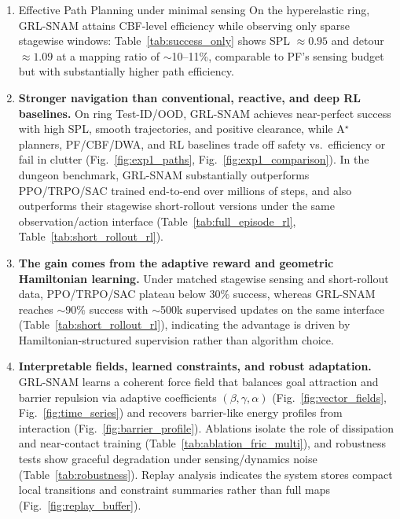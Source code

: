 \documentclass{article} %
\begin{document}
\begin{enumerate}
    \item { Effective Path Planning under minimal sensing}
    On the hyperelastic ring, GRL-SNAM attains CBF-level efficiency while observing only sparse stagewise windows: Table~\ref{tab:success_only} shows SPL $\approx 0.95$ and detour $\approx 1.09$ at a mapping ratio of $\sim$10--11\%, comparable to PF's sensing budget but with substantially higher path efficiency.

    \item \textbf{Stronger navigation than {conventional, reactive, and deep RL baselines.}}
    On ring Test-ID/OOD, GRL-SNAM achieves near-perfect success with high SPL, smooth trajectories, and positive clearance, while A$^{\star}$ planners, PF/CBF/DWA, and RL baselines trade off safety vs.\ efficiency or fail in clutter (Fig.~\ref{fig:exp1_paths}, Fig.~\ref{fig:exp1_comparison}). In the dungeon benchmark, GRL-SNAM substantially outperforms PPO/TRPO/SAC trained end-to-end over millions of steps, and also outperforms their stagewise short-rollout versions under the same observation/action interface (Table~\ref{tab:full_episode_rl}, Table~\ref{tab:short_rollout_rl}).

    \item \textbf{The gain comes from the { adaptive reward and geometric Hamiltonian learning.}}
    Under matched stagewise sensing and short-rollout data, PPO/TRPO/SAC plateau below $30\%$ success, whereas GRL-SNAM reaches $\sim$90\% success with $\sim$500k supervised updates on the same interface (Table~\ref{tab:short_rollout_rl}), indicating the advantage is driven by Hamiltonian-structured supervision rather than algorithm choice.

    \item \textbf{Interpretable fields, learned constraints, and robust adaptation.}
    GRL-SNAM learns a coherent force field that balances goal attraction and barrier repulsion via adaptive coefficients $(\beta,\gamma,\alpha)$ (Fig.~\ref{fig:vector_fields}, Fig.~\ref{fig:time_series}) and recovers barrier-like energy profiles from interaction (Fig.~\ref{fig:barrier_profile}). Ablations isolate the role of dissipation and near-contact training (Table~\ref{tab:ablation_fric_multi}), and robustness tests show graceful degradation under sensing/dynamics noise (Table~\ref{tab:robustness}). Replay analysis indicates the system stores compact local transitions and constraint summaries rather than full maps (Fig.~\ref{fig:replay_buffer}).
\end{enumerate}
\end{document}
